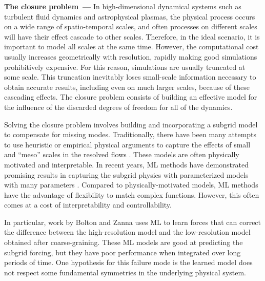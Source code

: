 \documentclass[11pt]{article}
\renewcommand{\paragraph}[1]{\medskip\par\noindent\textbf{#1~---}}
\begin{document}
\paragraph{The closure problem}
In high-dimensional dynamical systems such as turbulent fluid dynamics and astrophysical plasmas, the physical process occurs on a wide range of spatio-temporal scales, and often processes on different scales will have their effect cascade to other scales. 
Therefore, in the ideal scenario, it is important to model all scales at the same time.
However, the computational cost usually increases geometrically with resolution, rapidly making good simulations prohibitively expensive.
For this reason, simulations are usually truncated at some scale.
This truncation inevitably loses small-scale information necessary to obtain accurate results, including even on much larger scales, because of these cascading effects.
The closure problem consists of building an effective model for the influence of the discarded degrees of freedom for all of the dynamics.

Solving the closure problem involves building and incorporating a subgrid model to compensate for missing modes.
Traditionally, there have been many attempts to use heuristic or empirical physical arguments to capture the effects of small and ``meso'' scales in the resolved flows \cite{thuburn2014cascades,jansen2014parameterizing, mana2014toward, zanna2017scale, bachman2017scale, pearson2017evaluation, bachman2018relationship, jansen2019toward, bachman2019gm, grooms2015numerical, berloff2018dynamically, juricke2020ocean}.
These models are often physically motivated and interpretable.
In recent years, ML methods have demonstrated promising results in capturing the subgrid physics with parameterized models with many parameters \cite{rasp2018deep, Bolton2019,maulik2019subgrid, beck2019deep, yuval2020stable, guan2022stable, beucler2021climate, shamekh2022implicit, wang2022non}.
Compared to physically-motivated models, ML methods have the advantage of flexibility to match complex functions.
However, this often comes at a cost of interpretability and controllability.

In particular, work by Bolton and Zanna \cite{Bolton2019} uses ML to learn forces that can correct the difference between the high-resolution model and the low-resolution model obtained after coarse-graining. These ML models are good at predicting the subgrid forcing, but they have poor performance when integrated over long periods of time. One hypothesis for this failure mode is the learned model does not respect some fundamental symmetries in the underlying physical system.
\end{document}
